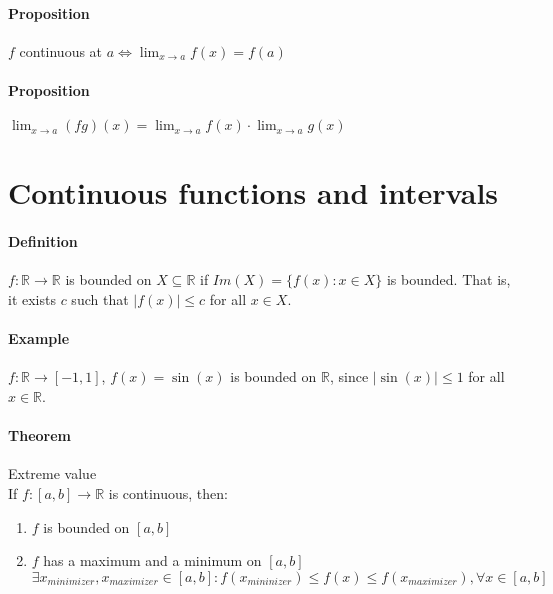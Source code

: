 \documentclass{article}
\newcommand{\abs}[1]{\left|#1\right|}
\newcommand{\func}[3]{#1 : #2 \rightarrow #3}
\newcommand{\functoR}[2]{#1 : #2 \rightarrow \mathbb{R}}
\newcommand{\funcR}[1]{#1 : \mathbb{R} \rightarrow \mathbb{R}}
\newcommand{\limx}[1]{\lim_{x \to #1}}
\newcommand{\intcc}[1]{\left[#1\right]}
\newcommand{\R}{\mathbb{R}}
\newcommand{\Def}{\paragraph{Definition}}
\newcommand{\Proposition}{\paragraph{Proposition}}
\newcommand{\Theorem}{\paragraph{Theorem}}
\newcommand{\Example}{\paragraph{Example}}
\begin{document}
  \Proposition $f$ continuous at $a \iff \limx{a} f(x) = f(a)$

  \Proposition $\limx{a} (fg)(x) = \limx{a} f(x) \cdot \limx{a} g(x)$


\section{Continuous functions and intervals}

  \Def $\funcR{f}$ is bounded on $X \subseteq \R$ if $Im(X) = \{ f(x) : x \in X
  \}$ is bounded. That is, it exists $c$ such that $\abs{f(x)} \leq c$ for all
  $x \in X$.

  \Example $\func{f}{\R}{\intcc{-1,1}}$, $f(x) = \sin(x)$ is bounded on $\R$,
  since $\abs{\sin(x)} \leq 1$ for all $x \in \R$.

  \Theorem Extreme value
\\If $\functoR{f}{\intcc{a,b}}$ is continuous, then:
  \begin{enumerate}[label=(\roman*)]
    \item $f$ is bounded on $\intcc{a,b}$
    \item $f$ has a maximum and a minimum on $\intcc{a,b}$
  \\$\exists x_{minimizer}, x_{maximizer} \in \intcc{a,b} :
  f(x_{mininizer}) \leq f(x) \leq f(x_{maximizer}), \forall x \in \intcc{a,b}$
  \end{enumerate}
\end{document}
